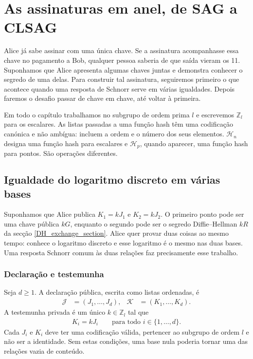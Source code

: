 \chapter{As assinaturas em anel, de SAG a CLSAG}
\label{chapter:advanced-schnorr}

Alice já sabe assinar com uma única chave. Se a assinatura
acompanhasse essa chave no pagamento a Bob, qualquer pessoa saberia
de que saída vieram os 11. Suponhamos que Alice apresenta algumas
chaves juntas e demonstra conhecer o segredo de uma delas. Para
construir tal assinatura, seguiremos primeiro o que acontece quando
uma resposta de Schnorr serve em várias igualdades. Depois faremos
o desafio passar de chave em chave, até voltar à primeira.

Em todo o capítulo trabalhamos no subgrupo de ordem prima \(l\) e escrevemos
\(\mathbb Z_l\) para os escalares. As listas passadas a uma função hash têm
uma codificação canónica e não ambígua: incluem a ordem e o número dos seus
elementos. \(\mathcal H_n\) designa uma função hash para escalares e
\(\mathcal H_p\), quando aparecer, uma função hash para pontos. São operações
diferentes.

\section{Igualdade do logaritmo discreto em várias bases}
\label{sec:proofs-discrete-logarithm-multiple-bases}

Suponhamos que Alice publica \(K_1=kJ_1\) e \(K_2=kJ_2\). O primeiro ponto
pode ser uma chave pública \(kG\), enquanto o segundo pode ser o segredo
Diffie--Hellman \(kR\) da secção \ref{DH_exchange_section}. Alice quer provar
duas coisas ao mesmo tempo: conhece o logaritmo discreto e esse logaritmo é o
mesmo nas duas bases. Uma resposta Schnorr comum às duas relações faz
precisamente esse trabalho.

\subsection*{Declaração e testemunha}

Seja \(d\geq 1\). A declaração pública, escrita como listas ordenadas, é
\begin{align*}
\mathcal{J} &= (J_1,\ldots,J_d), &
\mathcal{K} &= (K_1,\ldots,K_d).
\end{align*}
A testemunha privada é um único \(k\in\mathbb Z_l\) tal que
\begin{align*}
K_i=kJ_i\qquad\text{para todo }i\in\{1,\ldots,d\}.
\end{align*}
Cada \(J_i\) e \(K_i\) deve ter uma codificação válida, pertencer ao subgrupo
de ordem \(l\) e não ser a identidade. Sem estas condições, uma base nula
poderia tornar uma das relações vazia de conteúdo.

